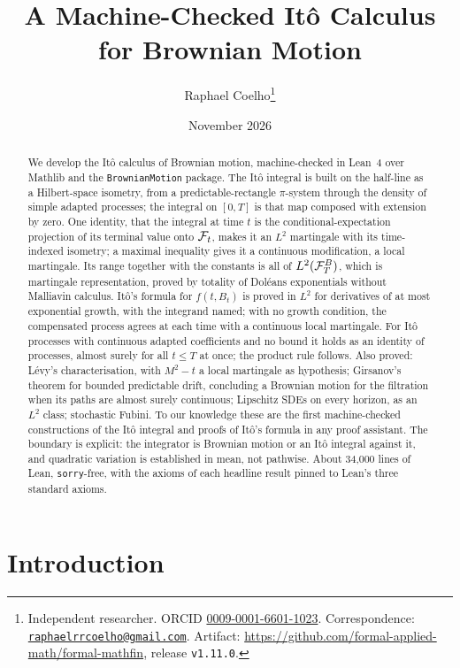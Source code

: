 \documentclass[11pt]{article}
\title{A Machine-Checked It\^o Calculus\\ for Brownian Motion}
\author{Raphael Coelho\thanks{Independent researcher. ORCID
  \href{https://orcid.org/0009-0001-6601-1023}{0009-0001-6601-1023}.
  Correspondence: \href{mailto:raphaelrrcoelho@gmail.com}{\texttt{raphaelrrcoelho@gmail.com}}.
  Artifact: \url{https://github.com/formal-applied-math/formal-mathfin}, release \texttt{v1.11.0}.}}
\date{November 2026}
\begin{document}
\maketitle

\begin{abstract}
\noindent
We develop the It\^o calculus of Brownian motion, machine-checked in Lean~4 over Mathlib and the
\texttt{BrownianMotion} package. The It\^o integral is built on the half-line as a Hilbert-space isometry, from a
predictable-rectangle $\pi$-system through the density of simple adapted processes; the integral on $[0,T]$ is
that map composed with extension by zero. One identity, that the integral at time $t$ is the
conditional-expectation projection of its terminal value onto $\mathcal{F}_t$, makes it an $L^2$ martingale with its
time-indexed isometry; a maximal inequality gives it a continuous modification, a local martingale. Its range
together with the constants is all of $L^2(\mathcal{F}^B_T)$, which is martingale representation, proved by totality of
Dol\'eans exponentials without Malliavin calculus. It\^o's formula for $f(t,B_t)$ is proved in $L^2$ for
derivatives of at most exponential growth, with the integrand named; with no growth condition, the compensated
process agrees at each time with a continuous local martingale. For It\^o processes with continuous adapted coefficients and no bound it holds as an identity of
processes, almost surely for all $t\le T$ at once; the product rule follows. Also proved: L\'evy's characterisation,
with $M^2-t$ a local martingale as hypothesis; Girsanov's theorem for bounded predictable drift, concluding a Brownian motion for the filtration when
its paths are almost surely continuous; Lipschitz SDEs on every horizon, as an $L^2$ class; stochastic Fubini. To our knowledge these are the first
machine-checked constructions of the It\^o integral and proofs of It\^o's formula in any proof assistant. The
boundary is explicit: the integrator is Brownian motion or an It\^o integral against it, and quadratic variation is
established in mean, not pathwise. About 34,000 lines of Lean, \texttt{sorry}-free, with the axioms
of each headline result pinned to Lean's three standard axioms.
\end{abstract}

\section{Introduction}
\end{document}
